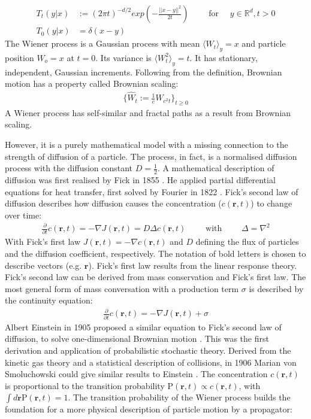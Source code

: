 \documentclass[
  a4paper,BCOR10mm,twoside,
  headsepline,footsepline,%
  fleqn,openbib
]{scrbook}
\begin{document}
\begin{align}
T_{t}(y|x) & := (2 \pi t)^{-d/2} exp \left(- \frac{||x-y||^2}{2 t}\right) \qquad  \text{ for } \quad y \in \mathbb{R}^d, t>0 \\ \nonumber
T_{0}(y|x) & = \delta(x-y) 
\end{align}
The Wiener process is a Gaussian process with mean $\langle W_t \rangle_y=x$ and particle position $W_o=x$ at $t=0$. Its variance is $\langle W^2_t \rangle_y= t$. It has stationary, independent, Gaussian increments. Following from the definition, Brownian motion has a property called Brownian scaling:
\begin{align}
\label{Brownianscaling}
\{\hat{W}_t := \frac{1}{c} W_{c^2 t} \}_{t\geq0} 
\end{align}
A Wiener process has self-similar and fractal paths as a result from Brownian scaling.\par\bigskip
However, it is a purely mathematical model with a missing connection to the strength of diffusion of a particle. The process, in fact, is a normalised diffusion process with the diffusion constant $D=\frac{1}{2}$. A mathematical description of diffusion was first realised by Fick in 1855 \cite{Fick1855}. He applied partial differential equations for heat transfer, first solved by Fourier in 1822 \cite{Fourier1822}. Fick's  second law of diffusion describes how diffusion causes the concentration ($c(\bm{r},t)$) to change over time:
\begin{align}
 \frac{\partial}{\partial t} c(\bm{r},t) = - \nabla J (\bm{r},t) = D  \Delta c(\bm{r},t) \qquad \text{ with } \qquad \Delta= \nabla^2  \label{eq:ficks}
\end{align}
With Fick's first law $J(\bm{r},t)=- \nabla c(\bm{r},t)$ and $D$ defining the flux of particles and the diffusion coefficient, respectively. The notation of bold letters is chosen to describe vectors (e.g. $\bm{r}$). Fick's first law results from the linear response theory. Fick's second law can be derived from mass conservation and Fick's first law. The most general form of mass conversation with a production term $\sigma$ is described by the continuity equation:
\begin{align} \label{continuity}
\frac{\partial}{\partial t} c(\bm{r},t)=- \nabla J(\bm{r},t)+ \sigma 
\end{align}
Albert Einstein in 1905 proposed a similar equation to Fick's second law of diffusion, to solve one-dimensional Brownian motion \cite{Einstein1905}. This was the first derivation and application of probabilistic stochastic theory. Derived from the kinetic gas theory and a statistical description of collisions, in 1906 Marian von Smoluchowski could give similar results to Einstein \cite{vonSmoluchowski1906}. The concentration $c(\bm{r},t)$ is proportional to the transition probability $\mathrm{P}(\bm{r},t) \propto c(\bm{r},t)$, with  $\int d\bm{r}\mathrm{P}(\bm{r},t)=1$. The transition probability of the Wiener process builds the foundation for a more physical description of particle motion by a propagator:
\end{document}
